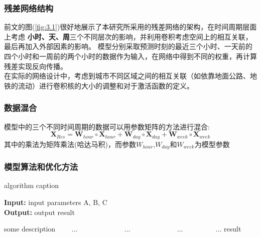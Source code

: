 \subsubsection*{残差网络结构}
前文的图(\ref{fig:3.1})很好地展示了本研究所采用的残差网络的架构，在时间周期层面上考虑 \textbf{小时、天、周}三个不同层次的影响，并利用卷积考虑空间上的相互关联，最后再加入外部因素的影响。 模型分别采取预测时刻的最近三个小时、一天前的四个小时和一周前的两个小时的数据作为输入，在网络中得到不同的权重，再计算残差实现反向传播。\\
在实际的网络设计中，考虑到城市不同区域之间的相互关联（如依靠地面公路、地铁的流动）进行卷积核的大小的调整和对于激活函数的定义。
\subsubsection*{数据混合}
模型中的三个不同时间周期的数据可以用参数矩阵的方法进行混合:
\begin{equation}
\mathbf { X } _ { R e s } = \mathbf { W } _ { hour } \circ \mathbf { X } _ { hour }  + \mathbf { W } _ {day } \circ \mathbf { X } _ { day }  + \mathbf { W } _ { week } \circ \mathbf { X } _ { week } 
\end{equation}
其中的乘法为矩阵乘法(哈达马积)，而参数$W_{hour}$,$W_{day}$和$W_{week}$为模型参数
\subsubsection*{模型算法和优化方法}
\begin{algorithm}[t]
\caption{algorithm caption} %
\hspace*{0.02in} {\bf Input:} %
input parameters A, B, C\\
\hspace*{0.02in} {\bf Output:} %
output result
\begin{algorithmic}[1]
\State some description %
　　\State ...
　　　　\State ...
　　\Else
　　　　\State ...
　　\EndIf
\EndFor
{} %
　　\State ...
\EndWhile
\State \Return result
\end{algorithmic}
\end{algorithm}